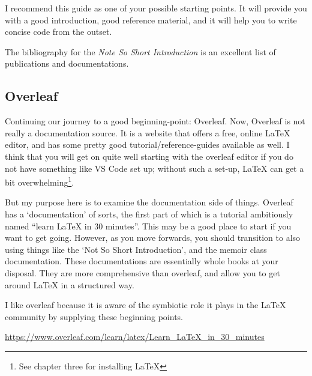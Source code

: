 \documentclass[11pt, oneside]{memoir}
\begin{document}
I recommend this guide as one of your possible starting points. It will provide you with a good introduction, good reference material, and it will help you to write concise code from the outset.

The bibliography for the \emph{Note So Short Introduction} is an excellent list of publications and documentations.

\subsection{Overleaf}

Continuing our journey to a good beginning-point: Overleaf. Now, Overleaf is not really a documentation source. It is a website that offers a free, online LaTeX editor, and has some pretty good tutorial/reference-guides available as well. I think that you will get on quite well starting with the overleaf editor if you do not have something like VS Code set up; without such a set-up, LaTeX can get a bit overwhelming\footnote{See chapter three for installing LaTeX}.

But my purpose here is to examine the documentation side of things. Overleaf has a `documentation' of sorts, the first part of which is a tutorial ambitiously named ``learn LaTeX in 30 minutes''. This may be a good place to start if you want to get going. However, as you move forwards, you should transition to also using things like the `Not So Short Introduction', and the memoir class documentation. These documentations are essentially whole books at your disposal. They are more comprehensive than overleaf, and allow you to get around LaTeX in a structured way.

I like overleaf because it is aware of the symbiotic role it plays in the LaTeX community by supplying these beginning points.

\url{https://www.overleaf.com/learn/latex/Learn_LaTeX_in_30_minutes}
\end{document}
